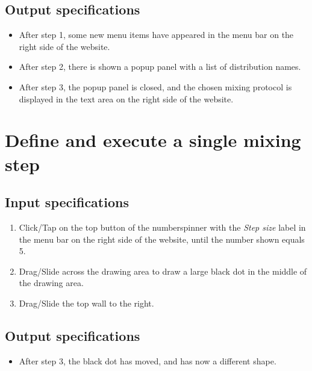 \subsection*{Output specifications}
\begin{itemize}
\item After step 1, some new menu items have appeared in the menu bar on the right side of the website.
\item After step 2, there is shown a popup panel with a list of distribution names.
\item After step 3, the popup panel is closed, and the chosen mixing protocol is displayed in the text area on the right side of the website.
\end{itemize}

\section{Define and execute a single mixing step}

\subsection*{Input specifications}
\begin{enumerate}
\item Click/Tap on the top button of the numberspinner with the \emph{Step size} label in the menu bar on the right side of the website, until the number shown equals 5.
\item Drag/Slide across the drawing area to draw a large black dot in the middle of the drawing area.
\item Drag/Slide the top wall to the right.
\end{enumerate}

\subsection*{Output specifications}
\begin{itemize}
\item After step 3, the black dot has moved, and has now a different shape.
\end{itemize}


